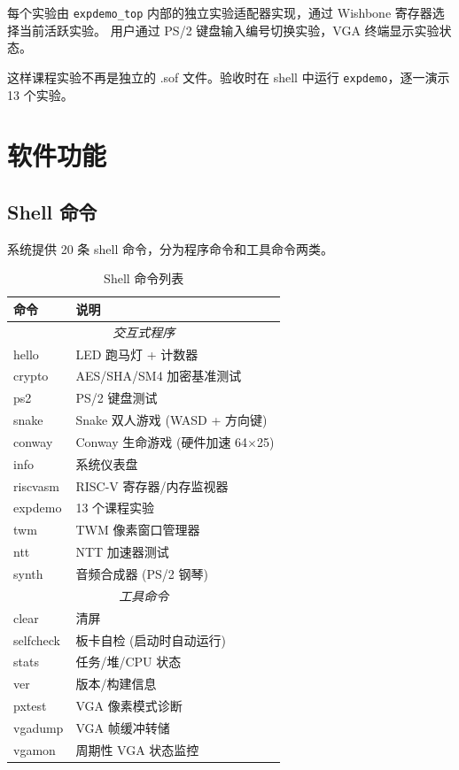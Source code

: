 \documentclass{SYSUReport}
\begin{document}
每个实验由 \texttt{expdemo\_top} 内部的独立实验适配器实现，通过 Wishbone 寄存器选择当前活跃实验。
用户通过 PS/2 键盘输入编号切换实验，VGA 终端显示实验状态。

这样课程实验不再是独立的 .sof 文件。验收时在 shell 中运行 \texttt{expdemo}，逐一演示 13 个实验。

\section{软件功能}

\subsection{Shell 命令}

系统提供 20 条 shell 命令，分为程序命令和工具命令两类。

\begin{table}[!htbp]
    \centering
    \small
    \begin{tabular}{l|l}
        \hline
        \textbf{命令} & \textbf{说明} \\
        \hline
        \multicolumn{2}{c}{\textit{交互式程序}} \\
        \hline
        hello    & LED 跑马灯 + 计数器 \\
        crypto   & AES/SHA/SM4 加密基准测试 \\
        ps2      & PS/2 键盘测试 \\
        snake    & Snake 双人游戏 (WASD + 方向键) \\
        conway   & Conway 生命游戏 (硬件加速 64$\times$25) \\
        info     & 系统仪表盘 \\
        riscvasm & RISC-V 寄存器/内存监视器 \\
        expdemo  & 13 个课程实验 \\
        twm      & TWM 像素窗口管理器 \\
        ntt      & NTT 加速器测试 \\
        synth    & 音频合成器 (PS/2 钢琴) \\
        \hline
        \multicolumn{2}{c}{\textit{工具命令}} \\
        \hline
        clear     & 清屏 \\
        selfcheck & 板卡自检 (启动时自动运行) \\
        stats     & 任务/堆/CPU 状态 \\
        ver       & 版本/构建信息 \\
        pxtest    & VGA 像素模式诊断 \\
        vgadump   & VGA 帧缓冲转储 \\
        vgamon    & 周期性 VGA 状态监控 \\
        \hline
    \end{tabular}
    \caption{Shell 命令列表}
    \label{tab:cmds}
\end{table}
\end{document}
